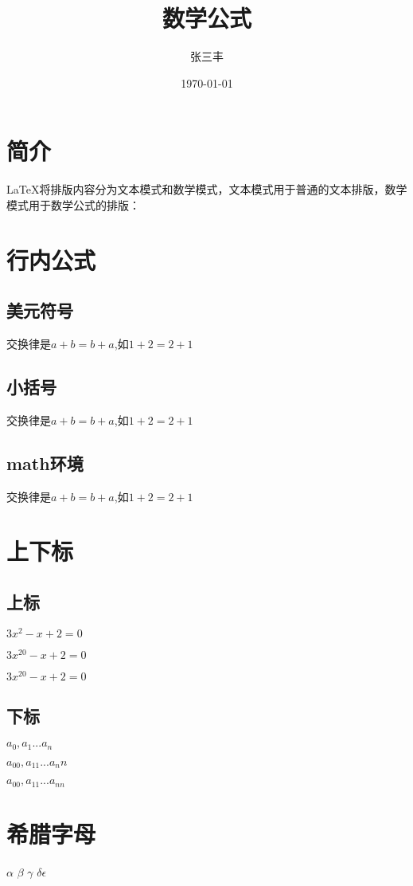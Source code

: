 \documentclass{article}
\title{数学公式}
\author{张三丰}
\date{\today}
\begin{document}
	\maketitle
	\section{简介}
	\LaTeX{}将排版内容分为文本模式和数学模式，文本模式用于普通的文本排版，数学模式用于数学公式的排版：
	\section{行内公式}
		\subsection{美元符号}
		交换律是$a+b = b+a $,如$1+2 = 2+1$
		\subsection{小括号}
		交换律是\(a+b = b+a \),如\(1+2 = 2+1\)
		\subsection{math环境}
		交换律是\begin{math}
			a+b = b+a
		\end{math},如\begin{math}
			1+2 = 2+1
		\end{math}
	\section{上下标}
		\subsection{上标}
		$3x^2 - x + 2 = 0$
		
		$3x^20 - x + 2 = 0$
		
		$3x^{20} - x + 2 = 0$
		\subsection{下标}
		$a_0,a_1...a_n$
		
		$a_00,a_11...a_nn$
		
		$a_{00},a_{11}...a_{nn}$
	\section{希腊字母}
	$\alpha $ \quad $\beta$ \quad $\gamma $ \quad $\delta $\quad $\epsilon $
	
\end{document}
